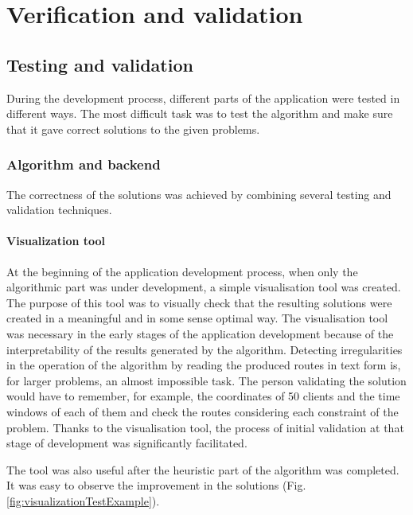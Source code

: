 \documentclass[a4paper,twoside,12pt]{book}
\begin{document}
     


\chapter{Verification and validation}
\section{Testing and validation}
During the development process, different parts of the application were tested in different ways. The most difficult task was to test the algorithm and make sure that it gave correct solutions to the given problems. 
\subsection{Algorithm and backend}
The correctness of the solutions was achieved by combining several testing and validation techniques.

\subsubsection{Visualization tool}
At the beginning of the application development process, when only the algorithmic part was under development, a simple visualisation tool was created. The purpose of this tool was to visually check that the resulting solutions were created in a meaningful and in some sense optimal way. The visualisation tool was necessary in the early stages of the application development because of the interpretability of the results generated by the algorithm. Detecting irregularities in the operation of the algorithm by reading the produced routes in text form is, for larger problems, an almost impossible task. The person validating the solution would have to remember, for example, the coordinates of 50 clients and the time windows of each of them and check the routes considering each constraint of the problem. Thanks to the visualisation tool, the process of initial validation at that stage of development was significantly facilitated.

The tool was also useful after the heuristic part of the algorithm was completed. It was easy to observe the improvement in the solutions (Fig. \ref{fig:visualizationTestExample}).
\end{document}
